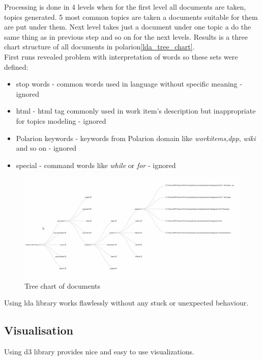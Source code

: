 \documentclass[thesis=M,english]{FITthesis}[2012/06/26]
\begin{document}
Processing is done in 4 levels when for the first level all documents are taken, topics generated. 5 most common topics are taken a documents suitable for them are put under them. Next level takes just a document under one topic a do the same thing as in previous step and so on for the next levels. Results is a three chart structure of all documents in \acrshort{polarion}\ref{lda_tree_chart}.\\

First runs revealed problem with interpretation of words so these sets were defined: 
\begin{itemize}[nosep]
 \item stop words - common words used in language without specific meaning - ignored
 \item html - html tag commonly used in work item's description but inappropriate for topics modeling - ignored
 \item Polarion keywords - keywords from Polarion domain like \textit{workitems},\textit{dpp}, \textit{wiki} and so on - ignored
 \item special - command words like \textit{while} or \textit{for} - ignored\\
\end{itemize}

\begin{figure}[h!]\centering
	\includegraphics[width=1\textwidth]{pictures/lda_tree_chart}
	\caption{Tree chart of documents}\label{fig:lda_tree_chart}
\end{figure}

Using \acrshort{lda} library works flawlessly without any stuck or unexpected behaviour.   

\subsection{Visualisation} 

Using \acrshort{d3} library provides nice and easy to use visualizations. 
\end{document}
